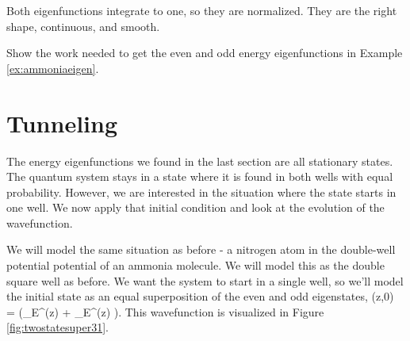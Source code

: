 \begin{example}
\begin{marginfigure}
\caption{ }
\label{fig:ex312b}
\end{marginfigure}

\assess Both eigenfunctions integrate to one, so they are normalized. They are the right shape, continuous, and smooth.

\end{example}

\begin{exercise}
Show the work needed to get the even and odd energy eigenfunctions in Example \ref{ex:ammoniaeigen}.
\end{exercise}

\section{Tunneling}
The energy eigenfunctions we found in the last section are all stationary states. The quantum system stays in a state where it is found in both wells with equal probability. However, we are interested in the situation where the state starts in one well. We now apply that initial condition and look at the evolution of the wavefunction. 

We will model the same situation as before - a nitrogen atom in the double-well potential potential of an ammonia molecule. We will model this as the double square well as before. We want the system to start in a single well, so we'll model the initial state as an equal superposition of the even and odd eigenstates,
\beq
\Psi(z,0) = \left(\psi_{E}^(z) + \psi_{E}^(z) \right).
\eeq
This wavefunction is visualized in Figure \ref{fig:twostatesuper31}.

